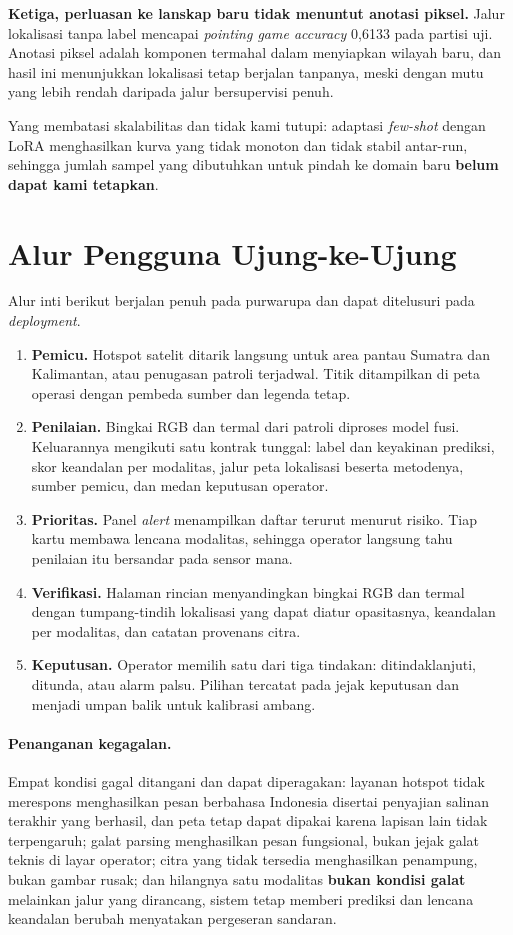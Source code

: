 \textbf{Ketiga, perluasan ke lanskap baru tidak menuntut anotasi piksel.} Jalur
lokalisasi tanpa label mencapai \emph{pointing game accuracy} 0,6133 pada
partisi uji. Anotasi piksel adalah komponen termahal dalam menyiapkan wilayah
baru, dan hasil ini menunjukkan lokalisasi tetap berjalan tanpanya, meski dengan
mutu yang lebih rendah daripada jalur bersupervisi penuh.

Yang membatasi skalabilitas dan tidak kami tutupi: adaptasi \emph{few-shot}
dengan LoRA menghasilkan kurva yang tidak monoton dan tidak stabil antar-run,
sehingga jumlah sampel yang dibutuhkan untuk pindah ke domain baru
\textbf{belum dapat kami tetapkan}.

\section{Alur Pengguna Ujung-ke-Ujung}
\label{app:alur}

Alur inti berikut berjalan penuh pada purwarupa dan dapat ditelusuri pada
\emph{deployment}.

\begin{enumerate}
\item \textbf{Pemicu.} Hotspot satelit ditarik langsung untuk area pantau
Sumatra dan Kalimantan, atau penugasan patroli terjadwal. Titik ditampilkan di
peta operasi dengan pembeda sumber dan legenda tetap.
\item \textbf{Penilaian.} Bingkai RGB dan termal dari patroli diproses model
fusi. Keluarannya mengikuti satu kontrak tunggal: label dan keyakinan prediksi,
skor keandalan per modalitas, jalur peta lokalisasi beserta metodenya, sumber
pemicu, dan medan keputusan operator.
\item \textbf{Prioritas.} Panel \emph{alert} menampilkan daftar terurut menurut
risiko. Tiap kartu membawa lencana modalitas, sehingga operator langsung tahu
penilaian itu bersandar pada sensor mana.
\item \textbf{Verifikasi.} Halaman rincian menyandingkan bingkai RGB dan termal
dengan tumpang-tindih lokalisasi yang dapat diatur opasitasnya, keandalan per
modalitas, dan catatan provenans citra.
\item \textbf{Keputusan.} Operator memilih satu dari tiga tindakan:
ditindaklanjuti, ditunda, atau alarm palsu. Pilihan tercatat pada jejak
keputusan dan menjadi umpan balik untuk kalibrasi ambang.
\end{enumerate}

\paragraph{Penanganan kegagalan.} Empat kondisi gagal ditangani dan dapat
diperagakan: layanan hotspot tidak merespons menghasilkan pesan berbahasa
Indonesia disertai penyajian salinan terakhir yang berhasil, dan peta tetap
dapat dipakai karena lapisan lain tidak terpengaruh; galat parsing menghasilkan
pesan fungsional, bukan jejak galat teknis di layar operator; citra yang tidak
tersedia menghasilkan penampung, bukan gambar rusak; dan hilangnya satu
modalitas \textbf{bukan kondisi galat} melainkan jalur yang dirancang, sistem
tetap memberi prediksi dan lencana keandalan berubah menyatakan pergeseran
sandaran.

